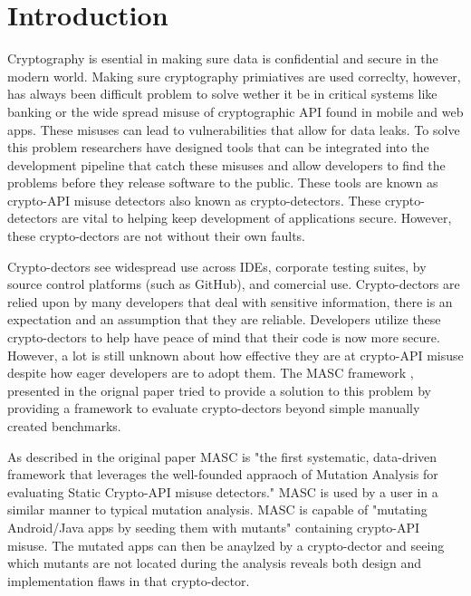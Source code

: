 \chapter{Introduction}
\label{chap_intro}


Cryptography is esential in making sure data is confidential and secure in the modern world. Making sure cryptography primiatives are used correclty, however, has always been difficult problem to solve wether it be in critical systems like banking or the wide spread misuse of cryptographic API found in mobile and web apps. These misuses can lead to vulnerabilities that allow for data leaks. To solve this problem researchers have designed tools that can be integrated into the development pipeline that catch these misuses and allow developers to find the problems before they release software to the public. These tools are known as crypto-API misuse detectors also known as crypto-detectors. These crypto-detectors are vital to helping keep development of applications secure. However, these crypto-dectors are not without their own faults.

Crypto-dectors see widespread use across IDEs, corporate testing suites, by source control platforms (such as GitHub), and comercial use. Crypto-dectors are relied upon by many developers that deal with sensitive information, there is an expectation and an assumption that they are reliable. Developers utilize these crypto-dectors to help have peace of mind that their code is now more secure. However, a lot is still unknown about how effective they are at crypto-API misuse despite how eager developers are to adopt them. The MASC framework \cite{Ami_2022}, presented in the orignal paper tried to provide a solution to this problem by providing a framework to evaluate crypto-dectors beyond simple manually created benchmarks.

As described in the original paper MASC is "the first systematic, data-driven framework that leverages the well-founded appraoch of Mutation Analysis for evaluating Static Crypto-API misuse detectors." MASC is used by a user in a similar manner to typical mutation analysis. MASC is capable of "mutating Android/Java apps by seeding them with mutants" containing crypto-API misuse. The mutated apps can then be anaylzed by a crypto-dector and seeing which mutants are not located during the analysis reveals both design and implementation flaws in that crypto-dector.

